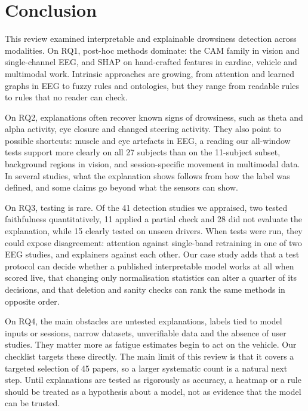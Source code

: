 \section{Conclusion}
\label{sec:conclusion}

This review examined interpretable and explainable drowsiness detection across modalities. On RQ1, post-hoc methods dominate: the CAM family in vision and single-channel EEG, and SHAP on hand-crafted features in cardiac, vehicle and multimodal work. Intrinsic approaches are growing, from attention and learned graphs in EEG to fuzzy rules and ontologies, but they range from readable rules to rules that no reader can check.

On RQ2, explanations often recover known signs of drowsiness, such as theta and alpha activity, eye closure and changed steering activity. They also point to possible shortcuts: muscle and eye artefacts in EEG, a reading our all-window tests support more clearly on all 27 subjects than on the 11-subject subset, background regions in vision, and session-specific movement in multimodal data. In several studies, what the explanation shows follows from how the label was defined, and some claims go beyond what the sensors can show.

On RQ3, testing is rare. Of the 41 detection studies we appraised, two tested faithfulness quantitatively, 11 applied a partial check and 28 did not evaluate the explanation, while 15 clearly tested on unseen drivers. When tests were run, they could expose disagreement: attention against single-band retraining in one of two EEG studies, and explainers against each other. Our case study adds that a test protocol can decide whether a published interpretable model works at all when scored live, that changing only normalisation statistics can alter a quarter of its decisions, and that deletion and sanity checks can rank the same methods in opposite order.

On RQ4, the main obstacles are untested explanations, labels tied to model inputs or sessions, narrow datasets, unverifiable data and the absence of user studies. They matter more as fatigue estimates begin to act on the vehicle. Our checklist targets these directly. The main limit of this review is that it covers a targeted selection of 45 papers, so a larger systematic count is a natural next step. Until explanations are tested as rigorously as accuracy, a heatmap or a rule should be treated as a hypothesis about a model, not as evidence that the model can be trusted.
